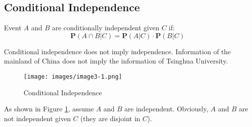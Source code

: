 \documentclass[device=normal, lang=en, fontsize=12pt]{elegantnote}
\numberwithin{equation}{section}
\begin{document}
\subsection{Conditional Independence}
\begin{definition}
    Event $A$ and $B$ are conditionally independent given $C$ if:
    \begin{equation}
        \mathbf{P}(A \cap B | C) = \mathbf{P}(A | C) \cdot \mathbf{P}(B | C)
    \end{equation}
\end{definition}
\begin{remark}
    Conditional independence does not imply independence. Information of the mainland of China does not imply the information of Tsinghua University.
\begin{figure}[H]
    \centering
    \texttt{[image: images/image3-1.png]}
    \caption{Conditional Independence}
    \label{fig:conditional-independence}
\end{figure}
As shown in Figure \ref{fig:conditional-independence}, assume $A$ and $B$ are independent. Obviously, $A$ and $B$ are not independent given $C$ (they are disjoint in $C$).
\end{remark}
\end{document}
